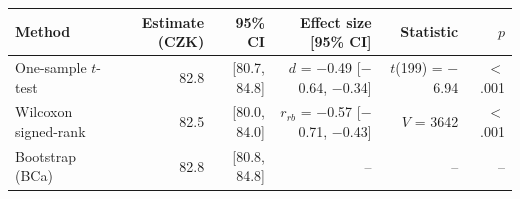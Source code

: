 \begin{tabular}{lrrrrr}
  \toprule
Method & Estimate (CZK) & 95\% CI & Effect size [95\% CI] & Statistic & $p$ \\ 
  \midrule
One-sample $t$-test & 82.8 & [80.7, 84.8] & $d$ = $-$0.49 [$-$0.64, $-$0.34] & $t$(199) = $-$6.94 & $<$.001 \\ 
  Wilcoxon signed-rank & 82.5 & [80.0, 84.0] & $r_{rb}$ = $-$0.57 [$-$0.71, $-$0.43] & $V$ = 3642 & $<$.001 \\ 
  Bootstrap (BCa) & 82.8 & [80.8, 84.8] & -- & -- & -- \\ 
   \bottomrule
\end{tabular}
